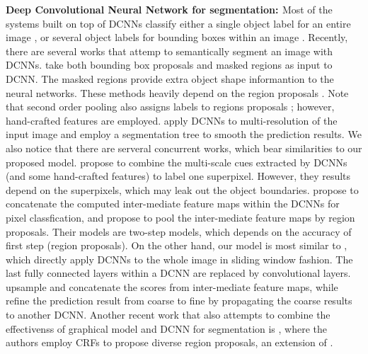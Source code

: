 {\bf{Deep Convolutional Neural Network for segmentation: }} Most of the systems built on top of DCNNs classify either a single object label for an entire image \citep{KrizhevskyNIPS2013, simonyan2014very, szegedy2014going}, or several object labels for bounding boxes within an image \citep{papandreou2014untangling, girshick2014rcnn}. Recently, there are several works that attemp to semantically segment an image with DCNNs. \citet{girshick2014rcnn, hariharan2014simultaneous} take both bounding box proposals and masked regions as input to DCNN. The masked regions provide extra object shape informantion to the neural networks. These methods heavily depend on the region proposals \citep{arbelaez2014multiscale, Uijlings13}. Note that second order pooling \citep{carreira2012semantic} also assigns labels to regions proposals \citep{carreira2012cpmc}; however, hand-crafted features are employed. \citet{farabet2013learning} apply DCNNs to multi-resolution of the input image and employ a segmentation tree to smooth the prediction results. We also notice that there are serveral concurrent works, which bear similarities to our proposed model. \citet{mostajabi2014feedforward} propose to combine the multi-scale cues extracted by DCNNs (and some hand-crafted features) to label one superpixel. However, they results depend on the superpixels, which may leak out the object boundaries. \citet{hariharan2014hypercolumns} propose to concatenate the computed inter-mediate feature maps within the DCNNs for pixel classfication, and \citet{dai2014convolutional} propose to pool the inter-mediate feature maps by region proposals. Their models are two-step models, which depends on the accuracy of first step (\ie region proposals). On the other hand, our model is most similar to \citet{long2014fully, eigen2014predicting}, which directly apply DCNNs to the whole image in sliding window fashion. The last fully connected layers within a DCNN are replaced by convolutional layers. \citet{long2014fully} upsample and concatenate the scores from inter-mediate feature maps, while \citet{eigen2014predicting} refine the prediction result from coarse to fine by propagating the coarse results to another DCNN. Another recent work that also attempts to combine the effectivenss of graphical model and DCNN for segmentation is \citet{cogswell2014combining}, where the authors employ CRFs to propose diverse region proposals, an extension of \citet{yadollahpour2013discriminative}.


